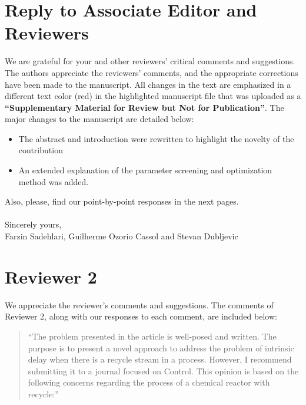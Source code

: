 \documentclass[10pt,answers]{exam}
\begin{document}
\section*{Reply to Associate Editor and Reviewers}
We are grateful for your and other reviewers' critical comments and suggestions. 
\vspace{0.2in}
\\
The authors appreciate the reviewers' comments, and the appropriate corrections have been made to the manuscript. All changes in the text are emphasized in a different text color (red) in the highlighted manuscript file that was uploaded as a {\bf{``Supplementary Material for Review but Not for Publication''}}. The major changes to the manuscript are detailed below:\\
\begin{itemize}
\item{The abstract and introduction were rewritten to highlight the novelty of the contribution}
\item{An extended explanation of the parameter screening and optimization method was added.}
\end{itemize}

Also, please, find our point-by-point responses in the next pages.\\
\\ 
Sincerely yours,\\
Farzin Sadehlari, Guilherme Ozorio Cassol and Stevan Dubljevic
\newpage



\section*{Reviewer 2}

We appreciate the reviewer's comments and suggestions. The comments of Reviewer 2, along with our responses to each comment, are included below:

\begin{quote}
    ``The problem presented in the article is well-posed and written. The purpose is to present a novel approach to address the problem of intrinsic delay when there is a recycle stream in a process. However, I recommend submitting it to a journal focused on Control. This opinion is based on the following concerns regarding the process of a chemical reactor with recycle:''
\end{quote}
\end{document}

